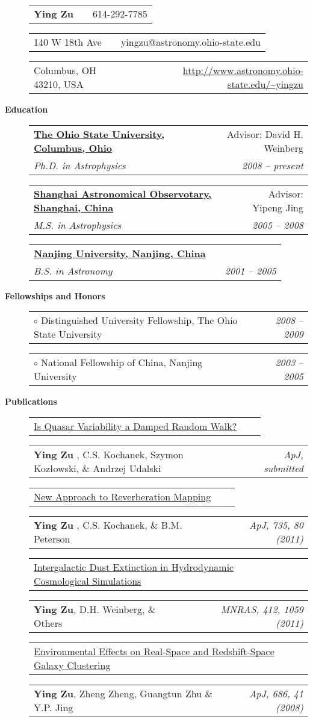 \documentclass[letterpaper,12pt]{article}
\makeatletter
\newcommand{\resheading}[1]{{\large
\colorbox{mygrey}{\begin{minipage}{6.5in}{\textbf{#1
    \vphantom{p\^{E}}}}\end{minipage}}}}
\newcommand{\toast}[2]{
 \begin{tabular*}{6.5in}{lr@{\extracolsep{\fill}}r} 
     #1          &             &           #2\\
 \end{tabular*}
 \vspace{-6pt}
}
\newcommand{\sandwich}[4]{
 \begin{tabular*}{6.5in}{lr@{\extracolsep{\fill}}r} 
     \textbf{#1} &             &           #2\\
     \textit{#3} &             & \textit{#4} \\ 
 \end{tabular*}
 \vspace{-6pt}
}
\makeatother
\begin{document}
\begin{description}
    \item[]\toast{\textbf{\large Ying Zu}}{614-292-7785}
    \item[]\toast{140 W 18th Ave}{yingzu@astronomy.ohio-state.edu}
    \item[]\toast{Columbus, OH 43210, USA}
        {\href{http://www.astronomy.ohio-state.edu/~yingzu}{\url{http://www.astronomy.ohio-state.edu/~yingzu}}}

\end{description}
\resheading{Education}
\begin{description}
    \item[]\sandwich{\href{http://www.astronomy.ohio-state.edu}{The Ohio State
    University, Columbus, Ohio}}{Advisor: David H. Weinberg }{Ph.D. in
    Astrophysics}{2008 -- present}
    \item[]\sandwich{\href{http://www.shao.ac.cn}{Shanghai Astronomical
    Observotary, Shanghai, China}}{Advisor: Yipeng Jing }{M.S. in
    Astrophysics}{2005 -- 2008}
    \item[]\sandwich{\href{http://www.nju.edu.cn}{Nanjing University, Nanjing,
    China}}{ }{B.S. in Astronomy}{2001 -- 2005}
\end{description}
\resheading{Fellowships and Honors}
\begin{description}
    \item[]\toast{$\circ$ Distinguished University Fellowship, The Ohio State
        University}{\textit{2008 -- 2009}}
    \item[]\toast{$\circ$ National Fellowship of China, Nanjing University }
        {\textit{2003 -- 2005}}
\end{description}
\resheading{Publications}
\begin{description}
\item[]\toast{\href{http://arxiv.org/abs/1202.3783}{Is Quasar Variability a Damped Random Walk?}}{}
\item[]\toast{{\bf Ying Zu} , C.S. Kochanek, Szymon Koz\l{}owski, \& Andrzej Udalski}{\emph{ApJ, submitted}}
\item[]\toast{\href{http://arxiv.org/abs/1008.0641}{New Approach to Reverberation Mapping}}{}
\item[]\toast{{\bf Ying Zu} , C.S. Kochanek, \& B.M. Peterson}{\emph{ApJ, 735, 80 (2011)}}
\item[]\toast{\href{http://arxiv.org/abs/1005.4406}{Intergalactic Dust
    Extinction in Hydrodynamic Cosmological Simulations}}{}
\item[]\toast{{\bf Ying Zu}, D.H. Weinberg, \& Others}{\emph{MNRAS, 412, 1059 (2011)}}
\item[]\toast{\href{http://arxiv.org/abs/0712.3570}{Environmental Effects on
    Real-Space and Redshift-Space Galaxy Clustering}}{}
\item[]\toast{{\bf Ying Zu}, Zheng
    Zheng, Guangtun Zhu \& Y.P. Jing}{\emph{ApJ, 686, 41 (2008)}}
\end{description}
\end{document}
